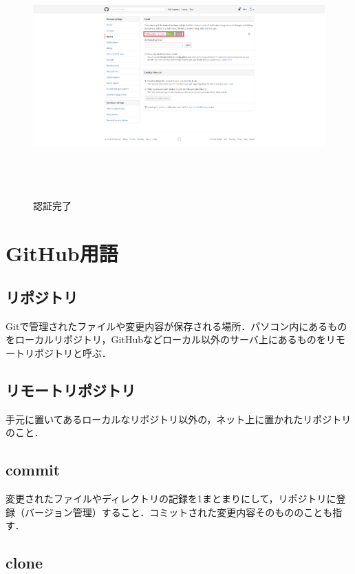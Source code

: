 \begin{figure}[htb]
\centering　
\includegraphics[height=8.5cm,width=13cm]{ok.PNG}
\caption{認証完了}
\end{figure}


\newpage


\section{GitHub用語}

\subsection{リポジトリ}

Gitで管理されたファイルや変更内容が保存される場所．パソコン内にあるものをローカルリポジトリ，GitHubなどローカル以外のサーバ上にあるものをリモートリポジトリと呼ぶ．

\subsection{リモートリポジトリ}

手元に置いてあるローカルなリポジトリ以外の，ネット上に置かれたリポジトリのこと．

\subsection{commit}

変更されたファイルやディレクトリの記録を1まとまりにして，リポジトリに登録（バージョン管理）すること．コミットされた変更内容そのもののことも指す．


\subsection{clone}

